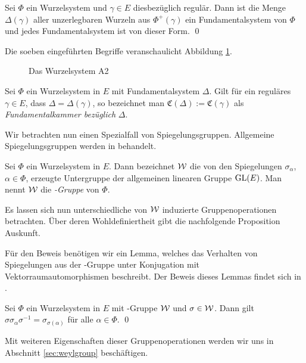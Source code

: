 \begin{thm}
  Sei $\Phi$ ein Wurzelsystem und $\gamma \in E$ diesbezüglich regulär.
  Dann ist die Menge $\Delta(\gamma)$ aller unzerlegbaren Wurzeln aus $\Phi^+(\gamma)$ ein Fundamentalsystem von $\Phi$ und jedes Fundamentalsystem ist von dieser Form. \qed
\end{thm}

Die soeben eingeführten Begriffe veranschaulicht Abbildung \ref{fig:fundamentalWeylChamber}.

\begin{figure}
  \caption{Das Wurzelsystem A2}
  \label{fig:fundamentalWeylChamber}
\end{figure}

\begin{defn}
  Sei $\Phi$ ein Wurzelsystem in $E$ mit Fundamentalsystem $\Delta$.
  Gilt für ein reguläres $\gamma \in E$, dass $\Delta = \Delta(\gamma)$, so bezeichnet man $\mathfrak{C}(\Delta) := \mathfrak{C}(\gamma)$ als \emph{Fundamentalkammer bezüglich} $\Delta$.
\end{defn}

Wir betrachten nun einen Spezialfall von Spiegelungsgruppen. Allgemeine Spiegelungsgruppen werden in \cite{humphreys1992reflection} behandelt.

\begin{defn}
  \label{def:weylgroup}
  Sei $\Phi$ ein Wurzelsystem in $E$. 
  Dann bezeichnet $\mathcal{W}$ die von den Spiegelungen $\sigma_\alpha$, $\alpha \in \Phi$, erzeugte Untergruppe der allgemeinen linearen Gruppe $\operatorname{GL}(E)$. 
  Man nennt $\mathcal{W}$ die \emph{\weyl\hyp{}Gruppe} von $\Phi$.
\end{defn}

Es lassen sich nun unterschiedliche von $\mathcal{W}$ induzierte Gruppenoperationen betrachten. Über deren Wohldefiniertheit gibt die nachfolgende Proposition Auskunft. 

Für den Beweis benötigen wir ein Lemma, welches das Verhalten von Spiegelungen aus der \weyl\hyp{}Gruppe unter Konjugation mit Vektorraumautomorphismen beschreibt. 
Der Beweis dieses Lemmas findet sich in \cite[S.43]{humphreys1972introduction}.

\begin{lem}
  \label{lem:conjReflection}
  Sei $\Phi$ ein Wurzelsystem in $E$ mit \weyl\hyp{}Gruppe $\mathcal{W}$ und $\sigma \in \mathcal{W}$.
  Dann gilt $\sigma \sigma_\alpha \sigma^{-1} = \sigma_{\sigma(\alpha)}$ für alle $\alpha \in \Phi$. \qed
\end{lem}

Mit weiteren Eigenschaften dieser Gruppenoperationen werden wir uns in Abschnitt \ref{sec:weylgroup} beschäftigen.

